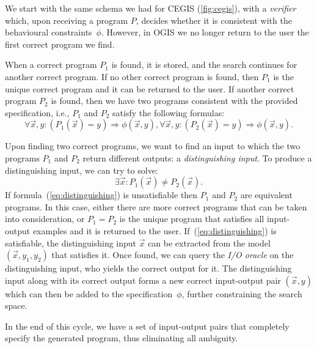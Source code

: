 We start with the same schema we had for \ac{CEGIS} (\autoref{fig:cegis}),  with a \textit{verifier} which, upon receiving a program \(P\), decides whether it is consistent with the behavioural constraints~\(\phi\). However, in \ac{OGIS} we no longer return to the user the first correct program we find.

When a correct program \(P_1\) is found, it is stored, and the search continues for another correct program. If no other correct program is found, then \(P_1\) is the unique correct program and it can be returned to the user. If another correct program \(P_2\) is found, then we have two programs consistent with the provided specification, i.e., \(P_1\) and \(P_2\) satisfy the following formulas:
%
\begin{subequations}
\begin{equation}
  \forall \vec{x}, y : (P_1(\vec{x}) = y) \Rightarrow \phi(\vec{x}, y),
\end{equation}
\begin{equation}
  \forall \vec{x}, y : (P_2(\vec{x}) = y) \Rightarrow \phi(\vec{x}, y).
\end{equation}
\end{subequations}

\noindent
Upon finding two correct programs, we want to find an input to which the two programs \(P_1\) and \(P_2\) return different outputs: a \textit{distinguishing input}. To produce a distinguishing input, we can try to solve:
%
\begin{equation}\label{eq:distinguishing}
  \exists \vec{x}: P_1(\vec{x}) \ne P_2(\vec{x}).
\end{equation}
%
If formula~(\ref{eq:distinguishing}) is unsatisfiable then \(P_1\) and \(P_2\) are equivalent programs.
In this case, either there are more correct programs that can be taken into consideration, or \(P_1 = P_2\) is the unique program that satisfies all input-output examples and it is returned to the user.
If~(\ref{eq:distinguishing}) is satisfiable, the distinguishing input \(\vec{x}\) can be extracted from the model \((\vec{x}, y_1, y_2)\) that satisfies it.
Once found, we can query the \textit{I/O oracle} on the distinguishing input, who yields the correct output for it.
The distinguishing input along with its correct output forms a new correct input-output pair \((\vec{x}, y)\) which can then be added to the specification~\(\phi\), further constraining the search space.

In the end of this cycle, we have a set of input-output pairs that completely specify the generated program, thus eliminating all ambiguity.

